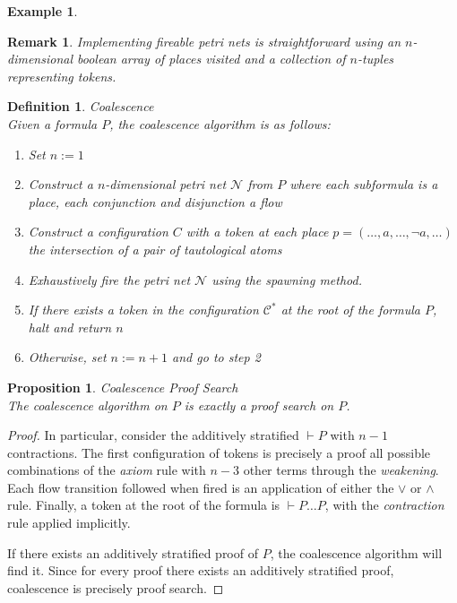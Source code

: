 \documentclass{article}
\theoremstyle{indented}
\newtheorem{definition}[sec-ctr]{Definition}
\newtheorem{proposition}[sec-ctr]{Proposition}
\newtheorem*{example*}{Example}
\newtheorem{remark}[sec-ctr]{Remark}
\begin{document}
        \begin{example*}
        \end{example*}

        \begin{remark}
            Implementing fireable petri nets is straightforward using an $n$-dimensional boolean array of places visited and a collection of $n$-tuples representing tokens.
        \end{remark}

        
        \begin{definition}{Coalescence\\}
            Given a formula $P$, the coalescence algorithm is as follows:
            \begin{enumerate}[noitemsep]
                \item Set  $n := 1$
                \item Construct a $n$-dimensional petri net $\mathcal{N}$ from $P$ where each subformula is a place, each conjunction and disjunction a flow
                \item Construct a configuration $C$ with a token at each place $p = (\ldots, a, \ldots, \neg a, \ldots)$ the intersection of a pair of tautological atoms
                \item Exhaustively fire the petri net $\mathcal{N}$ using the \textit{spawning} method.
                \item If there exists a token in the configuration $\mathcal{C^*}$ at the root of the formula $P$, halt and return $n$
                \item Otherwise, set $n := n + 1$ and go to step 2
            \end{enumerate}
        \end{definition}


        \begin{proposition}{Coalescence Proof Search\\}
            The coalescence algorithm on $P$ is exactly a proof search on $P$.
        \end{proposition}

        \begin{proof}
            In particular, consider the additively stratified $\vdash P$ with $n - 1$ contractions.
            The first configuration of tokens is precisely a proof all possible combinations of the \textit{axiom} rule with $n - 3$ other terms through the \textit{weakening}.
            Each flow transition followed when fired is an application of either the $\vee$ or $\wedge$ rule.
            Finally, a token at the root of the formula is $\vdash P \ldots P$, with the \textit{contraction} rule applied implicitly.

            If there exists an additively stratified proof of $P$, the coalescence algorithm will find it.
            Since for every proof there exists an additively stratified proof, coalescence is precisely proof search.
        \end{proof}
 
\end{document}
